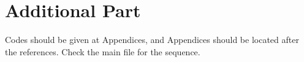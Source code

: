 \newpage
\section{Additional Part}
Codes should be given at Appendices, and Appendices should be located after the references. Check the main file for the sequence.